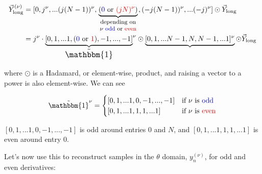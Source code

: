 \documentclass[10pt]{article}
\begin{document}
\begin{align*}
\vec{Y}_{\text{long}}^{(\nu)} &= [0, j^\nu, ... (j(N-1))^\nu, \underbrace{(\color{blue}0\color{black} \text{ or } \color{red}(jN)^\nu\color{black})}_{\parbox{20mm}{\footnotesize \centering depending on $\nu$ \color{blue}odd \color{black} or \color{red}even}}, (-j(N-1))^\nu, ... (-j)^\nu] \odot \vec{Y}_{\text{long}}\\
&= j^\nu \cdot {\underbrace{[0, 1, ... 1, (\color{blue}0 \color{black}\text{ or }\color{red} 1\color{black}), -1, ..., -1]}_{\text{\large $\tilde{\mathbbm{1}}$}}}^\nu \odot \underbrace{[0, 1, ... N-1, N, N-1, ... 1]^\nu} \odot \vec{Y}_{\text{long}}
\end{align*}

where $\odot$ is a Hadamard, or element-wise, product, and raising a vector to a power is also element-wise. We can see

$$\tilde{\mathbbm{1}}^\nu = \begin{cases} [0, 1, ... 1, 0, -1, ..., -1] & \text{if $\nu$ is \color{blue}odd}\\ [0, 1, ... 1, 1, 1, ... 1] & \text{if $\nu$ is \color{red}even}\end{cases}$$

$[0, 1, ... 1, 0, -1, ..., -1]$ is odd around entries $0$ and $N$, and $[0, 1, ... 1, 1, 1, ... 1]$ is even around entry $0$.\newline

Let's now use this to reconstruct samples in the $\theta$ domain, $y_n^{(\nu)}$, for odd and even derivatives:\vspace{-4mm}
\end{document}
